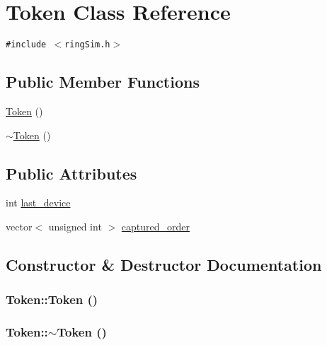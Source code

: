 \hypertarget{classToken}{
\section{Token Class Reference}
\label{classToken}
}
{\tt \#include $<$ringSim.h$>$}

\subsection*{Public Member Functions}
\begin{CompactItemize}
\item 
\hyperlink{classToken_a3c5868ba4115f3189df6b2ac5b36f39}{Token} ()
\item 
\hyperlink{classToken_3d7d59eaac1535df1433357d5d372f84}{$\sim$Token} ()
\end{CompactItemize}
\subsection*{Public Attributes}
\begin{CompactItemize}
\item 
int \hyperlink{classToken_2946e24204e9e41f07e25cc737c9e5ee}{last\_\-device}
\item 
vector$<$ unsigned int $>$ \hyperlink{classToken_aa5b37a82f9324d5d346cc03f15a6ad7}{captured\_\-order}
\end{CompactItemize}


\subsection{Constructor \& Destructor Documentation}
\hypertarget{classToken_a3c5868ba4115f3189df6b2ac5b36f39}{
\subsubsection[{Token}]{\setlength{\rightskip}{0pt plus 5cm}Token::Token ()}}
\label{classToken_a3c5868ba4115f3189df6b2ac5b36f39}


\hypertarget{classToken_3d7d59eaac1535df1433357d5d372f84}{
\subsubsection[{$\sim$Token}]{\setlength{\rightskip}{0pt plus 5cm}Token::$\sim$Token ()}}
\label{classToken_3d7d59eaac1535df1433357d5d372f84}




